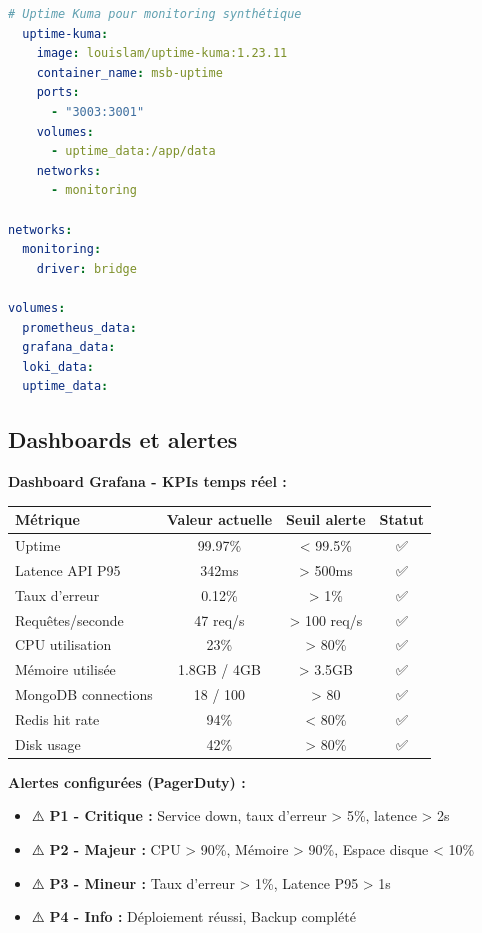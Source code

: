 \begin{exemple}
\begin{lstlisting}[language=yaml]
  # Uptime Kuma pour monitoring synthétique
  uptime-kuma:
    image: louislam/uptime-kuma:1.23.11
    container_name: msb-uptime
    ports:
      - "3003:3001"
    volumes:
      - uptime_data:/app/data
    networks:
      - monitoring

networks:
  monitoring:
    driver: bridge

volumes:
  prometheus_data:
  grafana_data:
  loki_data:
  uptime_data:
\end{lstlisting}
\end{exemple}

\subsection{Dashboards et alertes}

\begin{tcolorbox}[colback=yellow!5!white,colframe=yellow!60!black,title=\textbf{Métriques de monitoring en production (Décembre 2024)}]
\textbf{Dashboard Grafana - KPIs temps réel :}
\begin{center}
\begin{tabular}{|l|c|c|c|}
\hline
\textbf{Métrique} & \textbf{Valeur actuelle} & \textbf{Seuil alerte} & \textbf{Statut} \\
\hline
Uptime & 99.97\% & < 99.5\% & ✅ \\
Latence API P95 & 342ms & > 500ms & ✅ \\
Taux d'erreur & 0.12\% & > 1\% & ✅ \\
Requêtes/seconde & 47 req/s & > 100 req/s & ✅ \\
CPU utilisation & 23\% & > 80\% & ✅ \\
Mémoire utilisée & 1.8GB / 4GB & > 3.5GB & ✅ \\
MongoDB connections & 18 / 100 & > 80 & ✅ \\
Redis hit rate & 94\% & < 80\% & ✅ \\
Disk usage & 42\% & > 80\% & ✅ \\
\hline
\end{tabular}
\end{center}

\textbf{Alertes configurées (PagerDuty) :}
\begin{itemize}
    \item ⚠️ \textbf{P1 - Critique :} Service down, taux d'erreur > 5\%, latence > 2s
    \item ⚠️ \textbf{P2 - Majeur :} CPU > 90\%, Mémoire > 90\%, Espace disque < 10\%
    \item ⚠️ \textbf{P3 - Mineur :} Taux d'erreur > 1\%, Latence P95 > 1s
    \item ⚠️ \textbf{P4 - Info :} Déploiement réussi, Backup complété
\end{itemize}


\end{tcolorbox}
